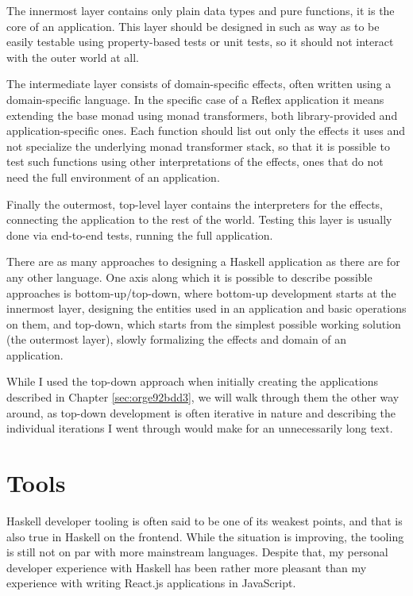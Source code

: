 \documentclass[english,zadani,odsaz]{fitthesis}
\begin{document}
The innermost layer contains only plain data types and pure functions, it is the
core of an application. This layer should be designed in such as way as to be
easily testable using property-based tests or unit tests, so it should not
interact with the outer world at all.

The intermediate layer consists of domain-specific effects, often written using
a domain-specific language. In the specific case of a Reflex application it
means extending the base monad using monad transformers, both library-provided
and application-specific ones. Each function should list out only the effects it
uses and not specialize the underlying monad transformer stack, so that it is
possible to test such functions using other interpretations of the effects, ones
that do not need the full environment of an application.

Finally the outermost, top-level layer contains the interpreters for the
effects, connecting the application to the rest of the world. Testing this layer
is usually done via end-to-end tests, running the full application.

There are as many approaches to designing a Haskell application as there are for
any other language. One axis along which it is possible to describe possible
approaches is bottom-up/top-down, where bottom-up development starts at the
innermost layer, designing the entities used in an application and basic
operations on them, and top-down, which starts from the simplest possible
working solution (the outermost layer), slowly formalizing the effects and
domain of an application.

While I used the top-down approach when initially creating the applications
described in Chapter \ref{sec:orge92bdd3}, we will walk through them the other way
around, as top-down development is often iterative in nature and describing the
individual iterations I went through would make for an unnecessarily long text.

\section{Tools}
\label{sec:org8fa7daa}
Haskell developer tooling is often said to be one of its weakest points, and
that is also true in Haskell on the frontend. While the situation is improving,
the tooling is still not on par with more mainstream languages. Despite that, my
personal developer experience with Haskell has been rather more pleasant than my
experience with writing React.js applications in JavaScript.
\end{document}
